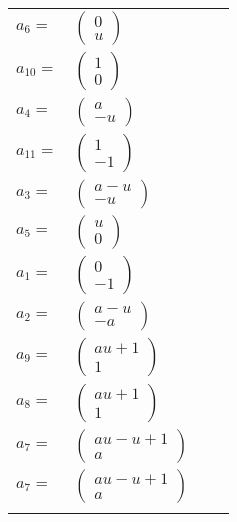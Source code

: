 \documentclass[1p]{elsarticle_modified}
\theoremstyle{definition}
\begin{document}
\begin{tabular}{m{7pt} m{180pt} m{7pt} m{180pt} }
\flushright $a_{6}=$&$\begin{pmatrix}0\\u\end{pmatrix}$ \\
\flushright $a_{10}=$&$\begin{pmatrix}1\\0\end{pmatrix}$ \\
\flushright $a_{4}=$&$\begin{pmatrix}a\\- u\end{pmatrix}$ \\
\flushright $a_{11}=$&$\begin{pmatrix}1\\-1\end{pmatrix}$ \\
\flushright $a_{3}=$&$\begin{pmatrix}a- u\\- u\end{pmatrix}$ \\
\flushright $a_{5}=$&$\begin{pmatrix}u\\0\end{pmatrix}$ \\
\flushright $a_{1}=$&$\begin{pmatrix}0\\-1\end{pmatrix}$ \\
\flushright $a_{2}=$&$\begin{pmatrix}a- u\\- a\end{pmatrix}$ \\
\flushright $a_{9}=$&$\begin{pmatrix}a u+1\\1\end{pmatrix}$ \\
\flushright $a_{8}=$&$\begin{pmatrix}a u+1\\1\end{pmatrix}$ \\
\flushright $a_{7}=$&$\begin{pmatrix}a u- u+1\\a\end{pmatrix}$\\ \flushright $a_{7}=$&$\begin{pmatrix}a u- u+1\\a\end{pmatrix}$\\&\end{tabular}
\end{document}
